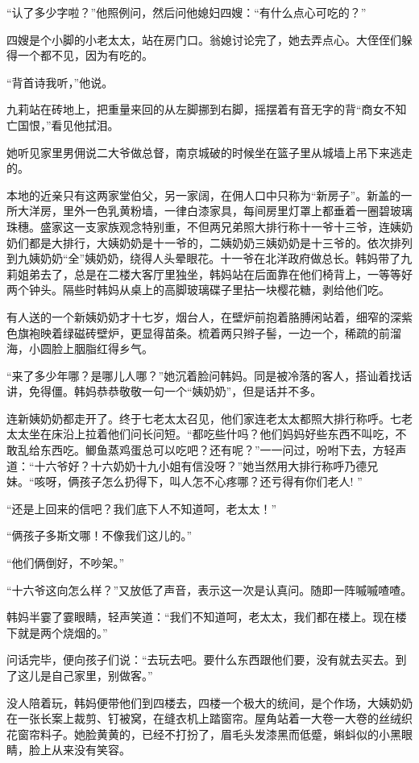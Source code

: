 \par “认了多少字啦？”他照例问，然后问他媳妇四嫂：“有什么点心可吃的？”
\par 四嫂是个小脚的小老太太，站在房门口。翁媳讨论完了，她去弄点心。大侄侄们躲得一个都不见，因为有吃的。
\par “背首诗我听，”他说。
\par 九莉站在砖地上，把重量来回的从左脚挪到右脚，摇摆着有音无字的背“商女不知亡国恨，”看见他拭泪。
\par 她听见家里男佣说二大爷做总督，南京城破的时候坐在篮子里从城墙上吊下来逃走的。
\par 本地的近亲只有这两家堂伯父，另一家阔，在佣人口中只称为“新房子”。新盖的一所大洋房，里外一色乳黄粉墙，一律白漆家具，每间房里灯罩上都垂着一圈碧玻璃珠穗。盛家这一支家族观念特别重，不但两兄弟照大排行称十一爷十三爷，连姨奶奶们都是大排行，大姨奶奶是十一爷的，二姨奶奶三姨奶奶是十三爷的。依次排列到九姨奶奶“全”姨奶奶，绕得人头晕眼花。十一爷在北洋政府做总长。韩妈带了九莉姐弟去了，总是在二楼大客厅里独坐，韩妈站在后面靠在他们椅背上，一等等好两个钟头。隔些时韩妈从桌上的高脚玻璃碟子里拈一块樱花糖，剥给他们吃。
\par 有人送的一个新姨奶奶才十七岁，烟台人，在壁炉前抱着胳膊闲站着，细窄的深紫色旗袍映着绿磁砖壁炉，更显得苗条。梳着两只辫子髻，一边一个，稀疏的前溜海，小圆脸上胭脂红得乡气。
\par “来了多少年哪？是哪儿人哪？”她沉着脸问韩妈。同是被冷落的客人，搭讪着找话讲，免得僵。韩妈恭恭敬敬一句一个“姨奶奶”，但是话并不多。
\par 连新姨奶奶都走开了。终于七老太太召见，他们家连老太太都照大排行称呼。七老太太坐在床沿上拉着他们问长问短。“都吃些什吗？他们妈妈好些东西不叫吃，不敢乱给东西吃。鲫鱼蒸鸡蛋总可以吃吧？还有呢？”一一问过，吩咐下去，方轻声道：“十六爷好？十六奶奶十九小姐有信没呀？”她当然用大排行称呼乃德兄妹。“咳呀，俩孩子怎么扔得下，叫人怎不心疼哪？还亏得有你们老人! ”
\par “还是上回来的信吧？我们底下人不知道呵，老太太！”
\par “俩孩子多斯文哪！不像我们这儿的。”
\par “他们俩倒好，不吵架。”
\par “十六爷这向怎么样？”又放低了声音，表示这一次是认真问。随即一阵嘁嘁喳喳。
\par 韩妈半霎了霎眼睛，轻声笑道：“我们不知道呵，老太太，我们都在楼上。现在楼下就是两个烧烟的。”
\par 问话完毕，便向孩子们说：“去玩去吧。要什么东西跟他们要，没有就去买去。到了这儿是自己家里，别做客。”
\par 没人陪着玩，韩妈便带他们到四楼去，四楼一个极大的统间，是个作场，大姨奶奶在一张长案上裁剪、钉被窝，在缝衣机上踏窗帘。屋角站着一大卷一大卷的丝绒织花窗帘料子。她脸黄黄的，已经不打扮了，眉毛头发漆黑而低蹙，蝌蚪似的小黑眼睛，脸上从来没有笑容。
